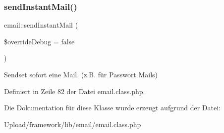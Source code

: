 \subsubsection{\texorpdfstring{send\+Instant\+Mail()}{sendInstantMail()}}
{\footnotesize\ttfamily email\+::send\+Instant\+Mail (\begin{DoxyParamCaption}\item[{}]{\$override\+Debug = {\ttfamily false} }\end{DoxyParamCaption})}

Sendset sofort eine Mail. (z.\+B. für Passwort Mails) 

Definiert in Zeile 82 der Datei email.\+class.\+php.



Die Dokumentation für diese Klasse wurde erzeugt aufgrund der Datei\+:\begin{DoxyCompactItemize}
\item 
Upload/framework/lib/email/email.\+class.\+php\end{DoxyCompactItemize}

